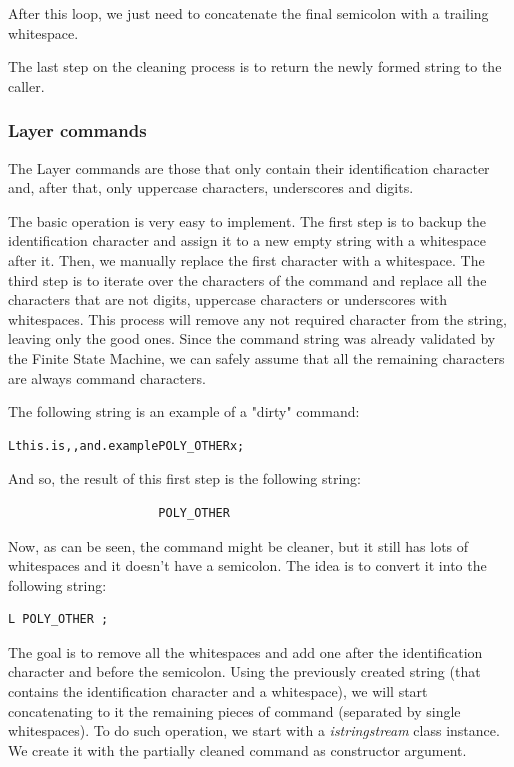\documentclass[11pt,twoside,openany,x11names,svgnames]{memoir}
\begin{document}
After this loop, we just need to concatenate the final semicolon with a trailing whitespace.

The last step on the cleaning process is to return the newly formed string to the caller.

\subsubsection{Layer commands}\label{Layer-commands}

The Layer commands are those that only contain their identification character and, after that, only uppercase characters, underscores and digits.

The basic operation is very easy to implement. The first step is to backup the identification character and assign it to a new empty string with a whitespace after it. Then, we manually replace the first character with a whitespace. The third step is to iterate over the characters of the command and replace all the characters that are not digits, uppercase characters or underscores with whitespaces. This process will remove any not required character from the string, leaving only the good ones. Since the command string was already validated by the Finite State Machine, we can safely assume that all the remaining characters are always command characters.

The following string is an example of a "dirty" command:

\begin{verbatim}
Lthis.is,,and.examplePOLY_OTHERx;
\end{verbatim}

And so, the result of this first step is the following string:

\begin{verbatim}
                     POLY_OTHER  
\end{verbatim}

Now, as can be seen, the command might be cleaner, but it still has lots of whitespaces and it doesn't have a semicolon. The idea is to convert it into the following string:

\begin{verbatim}
L POLY_OTHER ;
\end{verbatim}

The goal is to remove all the whitespaces and add one after the identification character and before the semicolon. Using the previously created string (that contains the identification character and a whitespace), we will start concatenating to it the remaining pieces of command (separated by single whitespaces). To do such operation, we start with a \textit{istringstream} class instance. We create it with the partially cleaned command as constructor argument.
\end{document}
